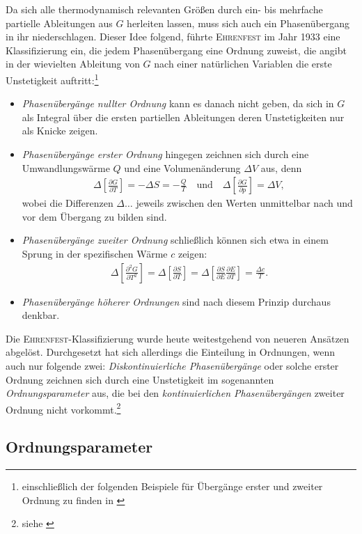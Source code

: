\documentclass[a4paper, 10pt, twoside, openany]{book} %
\newcommand \bracks[1]{\left [ #1 \right ]}
\newcommand \pdiff[2]{\frac{\partial #1}{\partial #2}}
\begin{document}
	Da sich alle thermodynamisch relevanten Größen durch ein- bis mehrfache partielle Ableitungen aus $G$ herleiten lassen, muss sich auch ein Phasenübergang in ihr niederschlagen. Dieser Idee folgend, führte \textsc{Ehrenfest} im Jahr 1933 eine Klassifizierung ein, die jedem Phasenübergang eine Ordnung zuweist, die angibt in der wievielten Ableitung von $G$ nach einer natürlichen Variablen die erste Unstetigkeit auftritt:\footnote{einschließlich der folgenden Beispiele für Übergänge erster und zweiter Ordnung zu finden in \cite[S.~155]{Ehrenfest2}}
	\begin{itemize}
		\item[] \emph{Phasenübergänge nullter Ordnung} kann es danach nicht geben, da sich in $G$ als Integral über die ersten partiellen Ableitungen deren Unstetigkeiten nur als Knicke zeigen.
		
		\item[] \emph{Phasenübergänge erster Ordnung} hingegen zeichnen sich durch eine Umwandlungswärme $Q$ und eine Volumenänderung $\Delta V$ aus, denn
		\begin{align*}
			\Delta \bracks{\pdiff G T} = -\Delta S = -\frac Q T \quad \text{und} \quad \Delta \bracks{\pdiff G p} = \Delta V,
		\end{align*}
		wobei die Differenzen $\Delta \dots$ jeweils zwischen den Werten unmittelbar nach und vor dem Übergang zu bilden sind. 
	
		\item[] \emph{Phasenübergänge zweiter Ordnung} schließlich können sich etwa in einem Sprung in der spezifischen Wärme $c$ zeigen:
		\begin{align*}
			\Delta \bracks{\pdiff{^2G}{T^2}} = \Delta \bracks{\pdiff S T} = \Delta \bracks{\pdiff S E \pdiff E T} = \frac {\Delta c} T.
		\end{align*}
		\item[] \emph{Phasenübergänge höherer Ordnungen} sind nach diesem Prinzip durchaus denkbar.
	\end{itemize}
	Die \textsc{Ehrenfest}-Klassifizierung wurde heute weitestgehend von neueren Ansätzen abgelöst. Durchgesetzt hat sich allerdings die Einteilung in Ordnungen, wenn auch nur folgende zwei: \emph{Diskontinuierliche Phasenübergänge} oder solche erster Ordnung zeichnen sich durch eine Unstetigkeit im sogenannten \emph{Ordnungsparameter} aus, die bei den \emph{kontinuierlichen Phasenübergängen} zweiter Ordnung nicht vorkommt.\footnote{siehe \cite[S.~315]{Fliessbach}}
	
	\subsection{Ordnungsparameter}
	
\end{document}

